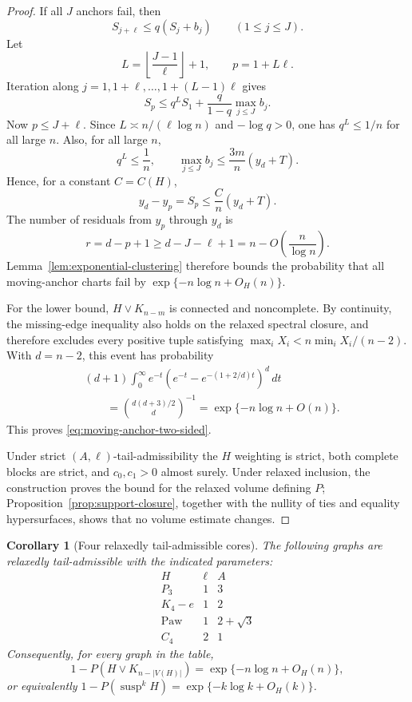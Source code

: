 \documentclass[11pt,reqno]{amsart}
\newtheorem{corollary}[theorem]{Corollary}
\theoremstyle{definition}
\theoremstyle{remark}
\newcommand{\susp}{\operatorname{susp}}
\begin{document}
\begin{proof}
If all $J$ anchors fail, then
\begin{equation}\label{eq:anchor-recurrence}
  S_{j+\ell}\le q(S_j+b_j)\qquad(1\le j\le J).
\end{equation}
Let
\[
  L=\left\lfloor\frac{J-1}{\ell}\right\rfloor+1,
  \qquad p=1+L\ell.
\]
Iteration along $j=1,1+\ell,\ldots,1+(L-1)\ell$ gives
\begin{equation}\label{eq:recurrence-iterated}
  S_p\le q^LS_1+\frac q{1-q}\max_{j\le J}b_j.
\end{equation}
Now $p\le J+\ell$.  Since
$L\asymp n/(\ell\log n)$ and $-\log q>0$, one has $q^L\le1/n$ for all
large $n$.  Also, for all large $n$,
\[
  q^L\le\frac1n,
  \qquad
  \max_{j\le J}b_j\le\frac{3m}{n}(y_d+T).
\]
Hence, for a constant $C=C(H)$,
\begin{equation}\label{eq:forced-cluster}
  y_d-y_p=S_p\le\frac Cn(y_d+T).
\end{equation}
The number of residuals from $y_p$ through $y_d$ is
\[
  r=d-p+1\ge d-J-\ell+1
   =n-O\!\left(\frac n{\log n}\right).
\]
Lemma~\ref{lem:exponential-clustering} therefore bounds the probability that
all moving-anchor charts fail by $\exp\{-n\log n+O_H(n)\}$.

For the lower bound, $H\vee K_{n-m}$ is connected and noncomplete.  By
continuity, the missing-edge inequality also holds on the relaxed spectral
closure, and therefore excludes every positive tuple satisfying
$\max_iX_i<n\min_iX_i/(n-2)$.  With $d=n-2$, this event has probability
\begin{align*}
 &(d+1)\int_0^\infty e^{-t}
   \left(e^{-t}-e^{-(1+2/d)t}\right)^d\,dt\\
 &\qquad=\binom{d(d+3)/2}{d}^{-1}
 =\exp\{-n\log n+O(n)\}.
\end{align*}
This proves \eqref{eq:moving-anchor-two-sided}.

Under strict $(A,\ell)$-tail-admissibility the $H$ weighting is strict, both complete
blocks are strict, and $c_0,c_1>0$ almost surely.  Under relaxed inclusion,
the construction proves the bound for the relaxed volume defining $P$;
Proposition~\ref{prop:support-closure}, together with the nullity of ties and
equality hypersurfaces, shows that no volume estimate changes.
\end{proof}

\begin{corollary}[Four relaxedly tail-admissible cores]
\label{cor:four-tail-cores}
The following graphs are relaxedly tail-admissible with the indicated
parameters:
\[
  \begin{array}{c|c|c}
    H&\ell&A\\ \hline
    P_3&1&3\\
    K_4-e&1&2\\
    \mathrm{Paw}&1&2+\sqrt3\\
    C_4&2&1
  \end{array}
\]
Consequently, for every graph in the table,
\begin{equation}\label{eq:four-core-suspension-law}
  1-P(H\vee K_{n-|V(H)|})
  =\exp\{-n\log n+O_H(n)\},
\end{equation}
or equivalently
$1-P(\susp^kH)=\exp\{-k\log k+O_H(k)\}$.
\end{corollary}
\end{document}
